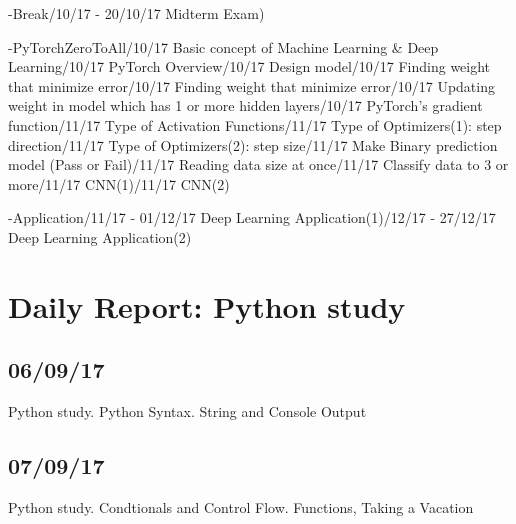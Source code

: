 \documentclass{article}
\begin{document}
\begin{CJK}{UTF8}{}
-Break/10/17 - 20/10/17 Midterm Exam)\newline

-PyTorchZeroToAll/10/17 Basic concept of Machine Learning & Deep Learning/10/17 PyTorch Overview/10/17 Design model/10/17 Finding weight that minimize error/10/17 Finding weight that minimize error/10/17 Updating weight in model which has 1 or more hidden layers/10/17 PyTorch's gradient function/11/17 Type of Activation Functions/11/17 Type of Optimizers(1): step direction/11/17 Type of Optimizers(2): step size/11/17 Make Binary prediction model (Pass or Fail)/11/17 Reading data size at once/11/17 Classify data to 3 or more/11/17 CNN(1)/11/17 CNN(2)\newline

-Application/11/17 - 01/12/17 Deep Learning Application(1)/12/17 - 27/12/17 Deep Learning Application(2)\newline


\section{Daily Report: Python study}
\subsection{06/09/17}
Python study. Python Syntax. String and Console Output\newline

\subsection{07/09/17}
Python study. Condtionals and Control Flow. Functions, Taking a Vacation\newline


\end{CJK}
\end{document}
